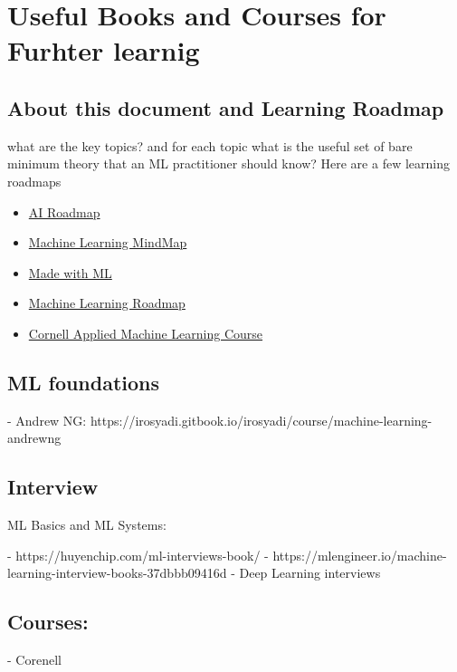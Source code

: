 \documentclass[openany]{book}
\begin{document}
\chapter{Useful Books and Courses for Furhter learnig}

\section{About this document and Learning Roadmap}


what are the key topics? and for each topic what is the useful set of bare minimum theory that an ML practitioner should know? Here are a few learning roadmaps 

\begin{itemize}
    \item \href{https://i.am.ai/roadmap/#note }{AI Roadmap} 
    \item \href{https://github.com/dformoso/machine-learning-mindmap
}{Machine Learning MindMap} 
    \item \href{https://madewithml.com/}{Made with ML} 
    \item \href{https://whimsical.com/machine-learning-roadmap-2020-CA7f3ykvXpnJ9Az32vYXva }{Machine Learning Roadmap}
    \item \href{https://www.youtube.com/watch?v=vcE9WGbi4QY
}{Cornell Applied Machine Learning Course} 

\end{itemize}



\section{ML foundations}

- Andrew NG: https://irosyadi.gitbook.io/irosyadi/course/machine-learning-andrewng


\section{Interview}

ML Basics and ML Systems: 

- https://huyenchip.com/ml-interviews-book/
- https://mlengineer.io/machine-learning-interview-books-37dbbb09416d
- Deep Learning interviews 


\section{Courses:}

- Corenell
\end{document}
